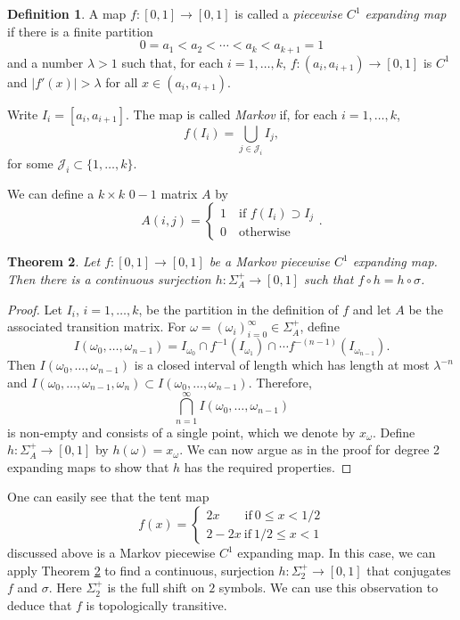 \documentclass[12pt]{article}
\newtheorem{theorem}{Theorem}[section]
\theoremstyle{definition}
\newtheorem{definition}[theorem]{Definition}
\theoremstyle{remark}
\begin{document}
\begin{definition}
A map $f : [0,1] \to [0,1]$ is called a {\it piecewise $C^1$ expanding map } if there is a finite partition
\[
0=a_1 < a_2 < \cdots < a_{k} < a_{k+1} =1
\]
and a number $\lambda>1$ such that, for each $i=1,\ldots,k$, $f: (a_i,a_{i+1}) \to [0,1]$ is $C^1$ and
$|f'(x)|>\lambda$ for all $x \in (a_i,a_{i+1})$.

Write $I_i = [a_i,a_{i+1}]$. The map is called {\it Markov} if, for each $i=1,\ldots,k$, 
\[
f(I_i) = \bigcup_{j \in \mathcal J_i} I_j,
\]
for some $\mathcal J_i \subset \{1,\ldots,k\}$. 
\end{definition}

We can define a $k \times k$ $0-1$ matrix $A$ by
\[
A(i,j) = \begin{cases} 1 \quad \text{if } f(I_i) \supset I_j \\
0 \quad \text{otherwise} \end{cases}.
\]





\begin{theorem} \label{sym_dyn_Markov_interval}
Let $f : [0,1] \to [0,1]$ be a Markov piecewise $C^1$ expanding map. Then there is a continuous
surjection $h : \Sigma_A^+ \to [0,1]$ such that $f \circ h = h \circ \sigma$.
\end{theorem}

\begin{proof} 
Let $I_i$, $i=1,\ldots,k$, be the partition in the definition of $f$ and let $A$ be the associated 
transition matrix.
For $\omega = (\omega_i)_{i=0}^\infty \in \Sigma_A^+$, define
\[
I(\omega_0,\ldots,\omega_{n-1}) 
= I_{\omega_0} \cap f^{-1}(I_{\omega_1}) \cap \cdots f^{-(n-1)}(I_{\omega_{n-1}}).
\]
Then $I(\omega_0,\ldots,\omega_{n-1})$ is a closed interval of length which has length at most $ \lambda^{-n}$
and 
$I(\omega_0,\ldots,\omega_{n-1},\omega_n) \subset I(\omega_0,\ldots,\omega_{n-1}) $.
Therefore,
\[
\bigcap_{n=1}^\infty I(\omega_0,\ldots,\omega_{n-1}) 
\]
is non-empty and consists of a single point, which we denote by $x_\omega$.
Define $h : \Sigma_A^+ \to [0,1]$ by $h(\omega) = x_\omega$.
We can now argue as in the proof for degree 2 expanding maps to show that $h$ has the required
properties.
\end{proof}

One can easily see that the tent map
\[
f(x) = \begin{cases} 2x \qquad  \text{if} \ 0 \le x < 1/2 \\
2-2x \ \text{if} \ 1/2 \le x <1
\end{cases}
\]
discussed above 
is a Markov piecewise $C^1$ expanding map. In this case, we can apply Theorem \ref{sym_dyn_Markov_interval} to find a continuous, surjection $h : \Sigma_2^+ \to [0,1]$ that conjugates $f$ and $\sigma$. Here $\Sigma_2^+$ is the full shift on $2$ symbols. We can use this observation to deduce that $f$ is topologically transitive.
\end{document}

